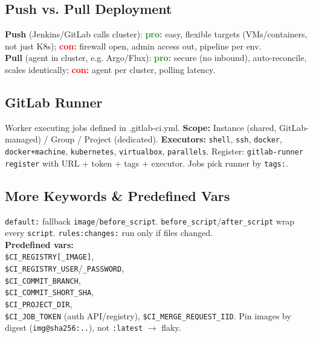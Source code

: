 \subsection{Push vs. Pull Deployment}
\textbf{Push} (Jenkins/GitLab calls cluster): \textcolor{ForestGreen}{\textbf{pro:}} easy, flexible targets (VMs/containers, not just K8s); \textcolor{red}{\textbf{con:}} firewall open, admin access out, pipeline per env.  \\
\textbf{Pull} (agent in cluster, e.g. Argo/Flux): \textcolor{ForestGreen}{\textbf{pro:}} secure (no inbound), auto-reconcile, scales identically; \textcolor{red}{\textbf{con:}} agent per cluster, polling latency.

\subsection{GitLab Runner}
Worker executing jobs defined in .gitlab-ci.yml. \textbf{Scope:} Instance (shared, GitLab-managed) / Group / Project (dedicated). \textbf{Executors:} \texttt{shell}, \texttt{ssh}, \texttt{docker}, \texttt{docker+machine}, \texttt{kubernetes}, \texttt{virtualbox}, \texttt{parallels}. Register: \texttt{gitlab-runner register} with URL + token + tags + executor. Jobs pick runner by \texttt{tags:}.

\subsection{More Keywords \& Predefined Vars}
\texttt{default:} fallback \texttt{image}/\texttt{before\_script}. \texttt{before\_script}/\texttt{after\_script} wrap every \texttt{script}. \texttt{rules:changes:} run only if files changed. \\
\textbf{Predefined vars:} \\
\texttt{\$CI\_REGISTRY[\_IMAGE]}, \\
\texttt{\$CI\_REGISTRY\_USER}/\texttt{\_PASSWORD}, \\
\texttt{\$CI\_COMMIT\_BRANCH}, \\
\texttt{\$CI\_COMMIT\_SHORT\_SHA}, \\
\texttt{\$CI\_PROJECT\_DIR}, \\
\texttt{\$CI\_JOB\_TOKEN} (auth API/registry),
\texttt{\$CI\_MERGE\_REQUEST\_IID}. Pin images by digest (\texttt{img@sha256:..}), not \texttt{:latest} $\rightarrow$ flaky.
